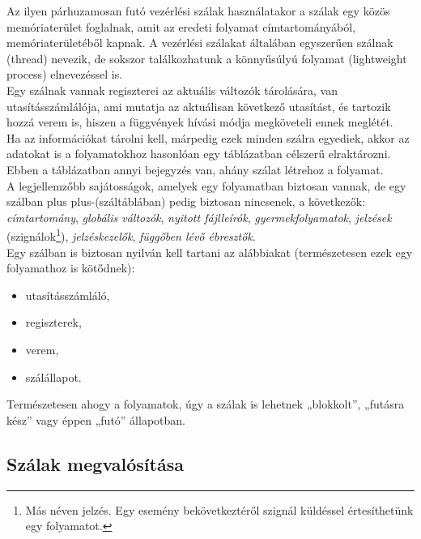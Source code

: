 \documentclass[tikz,12pt,margin=0px]{article}
\newcommand\lword[1]{\leavevmode\nobreak\hskip0pt plus\linewidth\penalty50\hskip0pt plus-\linewidth\nobreak #1}
\begin{document}
    \noindent Az ilyen párhuzamosan futó vezérlési szálak használatakor a szálak egy közös memóriaterület foglalnak, amit az eredeti folyamat címtartományából, memóriaterületéből kapnak. A vezérlési szálakat általában egyszerűen szálnak (thread) nevezik, de sokszor találkozhatunk a könnyűsúlyú folyamat (lightweight process) elnevezéssel is.\\

    \noindent Egy szálnak vannak regiszterei az aktuális változók tárolására, van utasításszámlálója, ami mutatja az aktuálisan következő utasítást, és tartozik hozzá verem is, hiszen a függvények hívási módja megköveteli ennek meglétét.\\

    \noindent Ha az információkat tárolni kell, márpedig ezek minden szálra egyediek, akkor az adatokat is a folyamatokhoz hasonlóan egy táblázatban célszerű elraktározni. Ebben a táblázatban annyi bejegyzés van, ahány szálat létrehoz a folyamat.\\
\newpage
    \noindent A legjellemzőbb sajátosságok, amelyek egy folyamatban biztosan vannak, de egy szálban \lword{(száltáblában)} pedig biztosan nincsenek, a következők:
        \emph{címtartomány}, \emph{globális változók}, \emph{nyitott fájlleírók}, \emph{gyermekfolyamatok}, \emph{jelzések} (szignálok\footnote{Más néven jelzés. Egy esemény bekövetkeztéről szignál küldéssel értesíthetünk egy folyamatot.}), \emph{jelzéskezelők}, \emph{függőben lévő ébresztők}.\\

    \noindent Egy szálban is biztosan nyilván kell tartani az alábbiakat (természetesen ezek egy folyamathoz is kötődnek):
    \begin{itemize}[topsep=8pt,itemsep=4pt,partopsep=4pt, parsep=4pt]
        \item utasításszámláló,
        \item regiszterek,
        \item verem,
        \item szálállapot.
    \end{itemize}

    \noindent Természetesen ahogy a folyamatok, úgy a szálak is lehetnek „blokkolt”, „futásra kész” vagy éppen „futó” állapotban.

    \subsection*{Szálak megvalósítása\\}
\end{document}
